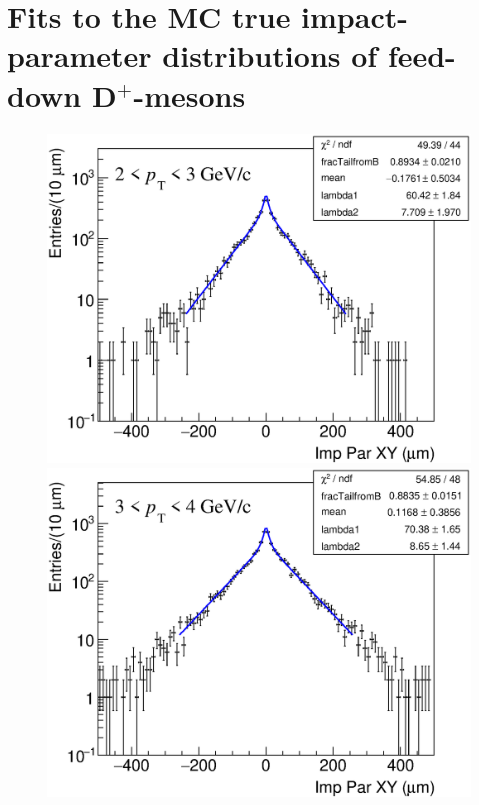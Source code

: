 \documentclass[b5paper,10pt,twoside,oldstyle,classica]{toptesi}
\begin{document}
\section{Fits to the MC true impact-parameter distributions of feed-down D$^+$-mesons}
\label{FD_prefit_appendix}
\begin{figure}[h]
\begin{center}
\vspace{-0.3cm}
{\includegraphics[scale = 0.24]{ImpParTrueFD_2-3.eps}}
\hspace{0cm}
{\includegraphics[scale = 0.24]{ImpParTrueFD_3-4.eps}}
\vspace{0cm}

\end{center}
\end{figure}
\end{document}
